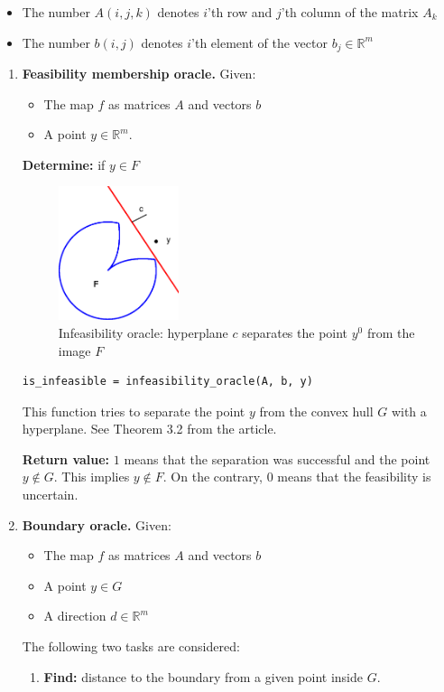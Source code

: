 \documentclass[a4paper]{article}
\newcommand{\R}{\mathbb{R}}
\theoremstyle{definition}
\begin{document}
\begin{itemize}
\item The number $A(i, j, k)$ denotes $i$'th row and $j$'th column of the matrix $A_k$
\item The number $b(i, j)$ denotes $i$'th element of the vector $b_j\in\mathbb{R}^m$
\end{itemize}

\begin{enumerate}
\item {\bf Feasibility membership oracle.} Given:
\begin{itemize}
\item The map $f$ as matrices $A$ and vectors $b$
\item A point $y\in\mathbb{R}^m$.
\end{itemize}
{\bf Determine:} if $y\in F$

\begin{figure}[H]
	\centering\includegraphics[width=100pt]{fig/infeasibility_oracle}
	\caption{Infeasibility oracle: hyperplane $c$ separates the point $y^0$ from the image $F$}
\end{figure}

\begin{verbatim}
is_infeasible = infeasibility_oracle(A, b, y)
\end{verbatim}

This function tries to separate the point $y$ from the convex hull $G$ with a hyperplane. See Theorem 3.2 from the article.

{\bf Return value:} $1$ means that the separation was successful and the point $y\notin G$. This implies $y\notin F$. On the contrary, $0$ means that the feasibility is uncertain.

\item {\bf Boundary oracle.} Given:
\begin{itemize}
	\item The map $f$ as matrices $A$ and vectors $b$
	\item A point $y\in G$
	\item A direction $d\in\R^m$
\end{itemize}
The following two tasks are considered:
\begin{enumerate}
\item {\bf Find:} distance to the boundary from a given point inside $G$.


\end{enumerate}
\end{enumerate}
\end{document}
